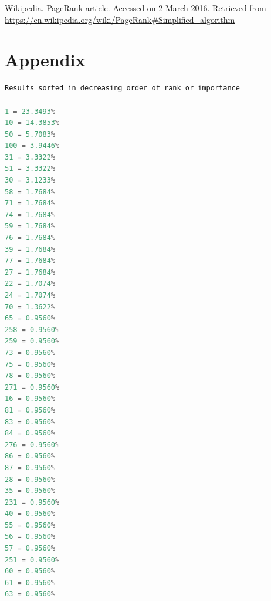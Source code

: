 \documentclass[9.5pt]{extarticle}
\begin{document}
Wikipedia. PageRank article. Accessed on 2 March 2016. Retrieved from \url{https://en.wikipedia.org/wiki/PageRank#Simplified_algorithm}\\

\newpage
\section{Appendix}

\begin{lstlisting}[language=java,caption={Output for PageRank on Course Dependency Graph}]
Results sorted in decreasing order of rank or importance

1 = 23.3493%
10 = 14.3853%
50 = 5.7083%
100 = 3.9446%
31 = 3.3322%
51 = 3.3322%
30 = 3.1233%
58 = 1.7684%
71 = 1.7684%
74 = 1.7684%
59 = 1.7684%
76 = 1.7684%
39 = 1.7684%
77 = 1.7684%
27 = 1.7684%
22 = 1.7074%
24 = 1.7074%
70 = 1.3622%
65 = 0.9560%
258 = 0.9560%
259 = 0.9560%
73 = 0.9560%
75 = 0.9560%
78 = 0.9560%
271 = 0.9560%
16 = 0.9560%
81 = 0.9560%
83 = 0.9560%
84 = 0.9560%
276 = 0.9560%
86 = 0.9560%
87 = 0.9560%
28 = 0.9560%
35 = 0.9560%
231 = 0.9560%
40 = 0.9560%
55 = 0.9560%
56 = 0.9560%
57 = 0.9560%
251 = 0.9560%
60 = 0.9560%
61 = 0.9560%
63 = 0.9560%
\end{lstlisting}
\end{document}
